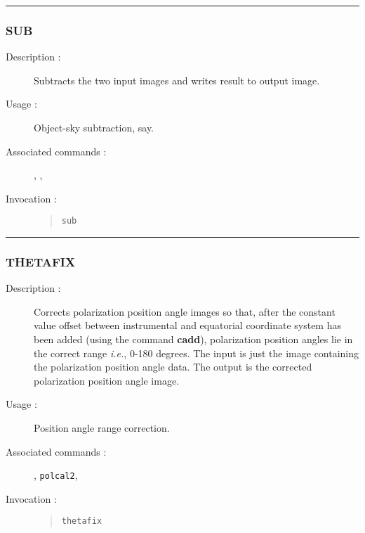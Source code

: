 \hrule 
\subsubsection*{\label{SUB}SUB}

\begin{description}

\item[Description :] Subtracts the two input images and writes result
to output image.

\item[Usage :] Object-sky subtraction, say.

\item[Associated commands :] {\tt {}}, 
{\tt {}}, {\tt {}}

\item[Invocation :]

\begin{quote}{\tt  sub }\end{quote}

\end{description}

\hrule 
\subsubsection*{\label{THETAFIX}THETAFIX}

\begin{description}

\item[Description :] Corrects polarization position angle images so
that, after the constant value offset between instrumental and
equatorial coordinate system has been added (using the command {\bf cadd}),
polarization position angles lie in the correct range \emph{i.e.},
0-180 degrees.  The input is just the image containing the polarization
position angle data.  The output is the corrected polarization position
angle image.

\item[Usage :] Position angle range correction.

\item[Associated commands :] {\tt {}}, 
{\tt polcal2}, {\tt {}}

\item[Invocation :]

\begin{quote}{\tt  thetafix }\end{quote}

\end{description}

